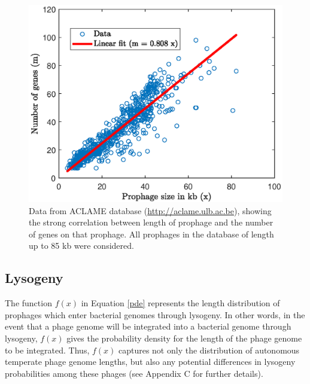 \begin{figure}[H] 
\centering
\includegraphics[scale=0.65]{genes}
\caption[Data showing the strong correlation between length of prophage and the number of genes on that prophage.]{Data from ACLAME database (\href{http://aclame.ulb.ac.be}{http://aclame.ulb.ac.be}), showing the strong correlation between length of prophage and the number of genes on that prophage.  All prophages in the database of length up to 85 kb were considered.}
\label{fig:genes}
\end{figure}

\subsection{Lysogeny}
The function $f(x)$ in Equation \ref{pde} represents the length distribution of prophages which enter bacterial genomes through lysogeny.  In other words, in the event that a phage genome will be integrated into a bacterial genome through lysogeny, $f(x)$ gives the probability density for the length of the phage genome to be integrated.  Thus, $f(x)$ captures not only the distribution of autonomous temperate phage genome lengths, but also any potential differences in lysogeny probabilities among these phages (see Appendix C for further details).

